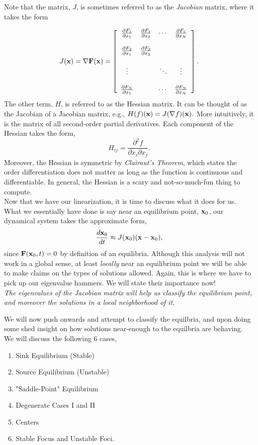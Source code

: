 Note that the matrix, $J$, is sometimes referred to as the \emph{Jacobian} matrix, where it takes the form 

$$J({\bf{x}})=\nabla{\bf{F}}({\bf{x}})=\left[ \begin{array}{cccc} \frac{\partial F_1 }{\partial x_1} & \frac{\partial F_1 }{\partial x_2} & \cdots & \frac{\partial F_1 }{\partial x_N} \\ \\
\frac{\partial F_2 }{\partial x_1} & \frac{\partial F_2 }{\partial x_2} & & \\ \\
\vdots & & \ddots & \vdots  \\ \\
\frac{\partial F_N }{\partial x_1} & & \cdots & \frac{\partial F_N }{\partial x_N}    \end{array} \right].$$
%
The other term, $H$, is referred to as the Hessian matrix. It can be thought of as the Jacobian of a Jacobian matrix, e.g., $H(f)({\bf{x}}) = J(\nabla f)({\bf{x}}).$ More intuitively, it is the matrix of all second-order partial derivatives. Each component of the Hessian takes the form, 
$$H_{ij} = \frac{\partial^2 f}{\partial x_i \partial x_j}.$$
%
Moreover, the Hessian is symmetric by \emph{Clairaut's Theorem}, which states the order differentiation does not matter as long as the function is continuous and differentiable. In general, the Hessian is a scary and not-so-much-fun thing to compute. \\

Now that we have our linearization, it is time to discuss what it does for us. What we essentially have done is say near an equilibrium point, ${\bf{x}}_0$, our dynamical system takes the approximate form, 
$$\frac{d{\bf{x}}_0}{dt} \approx J({\bf{x}}_0) ({\bf{x}}-{\bf{x}}_0),$$
%
since ${\bf{F}}({\bf{x}}_0,t) =0$ by definition of an equilibria. Although this analysis will not work in a global sense, at least \emph{locally} near an equilibrium point we will be able to make claims on the types of solutions allowed. Again, this is where we have to pick up our eigenvalue hammers. We will state their importance now! \\

\emph{The eigenvalues of the Jacobian matrix will help us classify the equilibrium point, and moreover the solutions in a local neighborhood of it.}

We will now push onwards and attempt to classify the equilbria, and upon doing some shed insight on how solutions near-enough to the equilbria are behaving. We will discuss the following $6$ cases, 
\begin{enumerate}
\item Sink Equilibrium (Stable)
\item Source Equilibrium (Unstable)
\item "Saddle-Point" Equilibrium
\item Degenerate Cases I and II
\item Centers
\item Stable Focus and Unstable Foci.
\end{enumerate}

